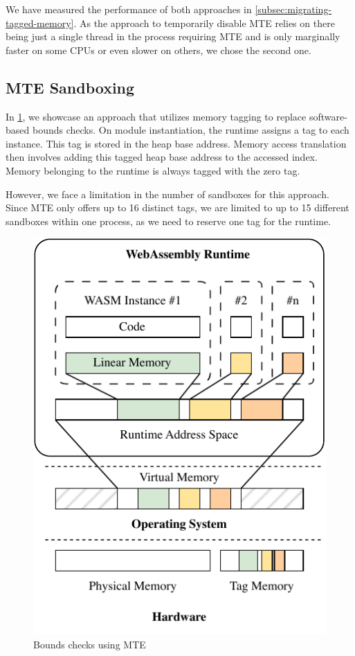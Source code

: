 \noindent
We have measured the performance of both approaches in \cref{subsec:migrating-tagged-memory}.
As the approach to temporarily disable \ac{MTE} relies on there being just a single thread in the process requiring \ac{MTE} and is only marginally faster on some CPUs or even slower on others, we chose the second one.

\subsection{\ac{MTE} Sandboxing}
\label{subsec:bounds-checks}

In \cref{fig:system-design-sandboxing}, we showcase an approach that utilizes memory tagging to replace software-based bounds checks.
On module instantiation, the runtime assigns a tag to each instance.
This tag is stored in the heap base address.
Memory access translation then involves adding this tagged heap base address to the accessed index.
Memory belonging to the runtime is always tagged with the zero tag.

However, we face a limitation in the number of sandboxes for this approach.
Since \ac{MTE} only offers up to 16 distinct tags, we are limited to up to 15 different sandboxes within one process, as we need to reserve one tag for the runtime.

\begin{figure}[t]
  \centering
  \includegraphics[scale=1]{figures/build/system-design-1}
  \caption{Bounds checks using MTE}
  \label{fig:system-design-sandboxing}
\end{figure}

